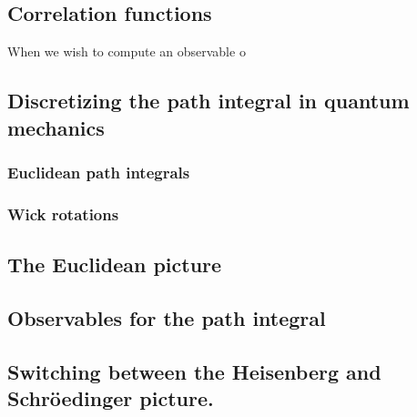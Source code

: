 \subsection{Correlation functions}
When we wish to compute an observable o

\subsection{Discretizing the path integral in quantum mechanics}

\subsubsection{Euclidean path integrals}

\subsubsection{Wick rotations} %


\subsection{The Euclidean picture}

\subsection{Observables for the path integral}

\subsection{Switching between the Heisenberg and Schröedinger picture.}





